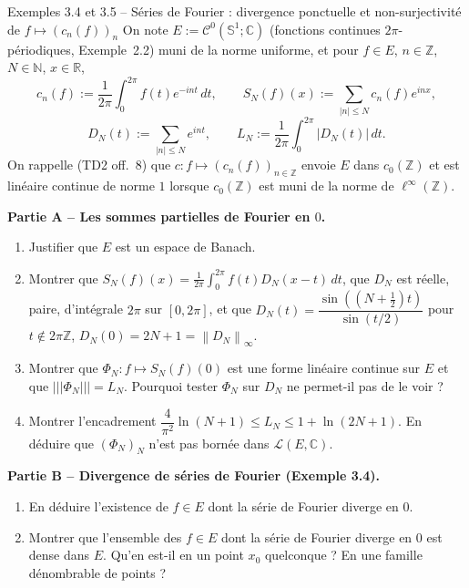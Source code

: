 \documentclass[11pt,a4paper]{article}
\newcommand{\R}{\mathbb{R}}
\newcommand{\N}{\mathbb{N}}
\newcommand{\Z}{\mathbb{Z}}
\newcommand{\C}{\mathbb{C}}
\newcommand{\norm}[1]{\left\|#1\right\|}
\newcommand{\opnorm}[1]{|\!|\!|#1|\!|\!|}
\newcommand{\Lc}{\mathcal{L}}
\newcommand{\Cz}{\mathcal{C}^0}
\newcommand{\Sun}{\mathbb{S}^1}
\theoremstyle{definition}
\begin{document}
\begin{exo}{Exemples 3.4 et 3.5 -- Séries de Fourier : divergence ponctuelle et non-surjectivité de $f\mapsto(c_n(f))_n$}
On note $E:=\Cz(\Sun;\C)$ (fonctions continues $2\pi$-périodiques, Exemple~2.2) muni de la norme uniforme, et pour $f\in E$, $n\in\Z$, $N\in\N$, $x\in\R$,
\[
c_n(f):=\frac1{2\pi}\int_0^{2\pi}f(t)e^{-int}\,dt,\qquad
S_N(f)(x):=\sum_{|n|\le N}c_n(f)e^{inx},
\]
\[
D_N(t):=\sum_{|n|\le N}e^{int},\qquad
L_N:=\frac1{2\pi}\int_0^{2\pi}|D_N(t)|\,dt .
\]
On rappelle (TD2 off.~8) que $c:f\mapsto(c_n(f))_{n\in\Z}$ envoie $E$ dans $c_0(\Z)$ et est linéaire continue de norme $1$ lorsque $c_0(\Z)$ est muni de la norme de $\ell^\infty(\Z)$.

\medskip
\noindent\textbf{Partie A -- Les sommes partielles de Fourier en $0$.}
\begin{enumerate}[label=(\alph*)]
  \item Justifier que $E$ est un espace de Banach.
  \item Montrer que $S_N(f)(x)=\frac1{2\pi}\int_0^{2\pi}f(t)D_N(x-t)\,dt$, que $D_N$ est réelle, paire, d'intégrale $2\pi$ sur $[0,2\pi]$, et que $D_N(t)=\dfrac{\sin((N+\frac12)t)}{\sin(t/2)}$ pour $t\notin2\pi\Z$, $D_N(0)=2N+1=\norm{D_N}_\infty$.
  \item Montrer que $\Phi_N:f\mapsto S_N(f)(0)$ est une forme linéaire continue sur $E$ et que $\opnorm{\Phi_N}=L_N$. Pourquoi tester $\Phi_N$ sur $D_N$ ne permet-il pas de le voir ?
  \item Montrer l'encadrement $\dfrac4{\pi^2}\ln(N+1)\le L_N\le1+\ln(2N+1)$. En déduire que $(\Phi_N)_N$ n'est pas bornée dans $\Lc(E,\C)$.
\end{enumerate}

\noindent\textbf{Partie B -- Divergence de séries de Fourier (Exemple 3.4).}
\begin{enumerate}[label=(\alph*),resume]
  \item En déduire l'existence de $f\in E$ dont la série de Fourier diverge en $0$.
  \item Montrer que l'ensemble des $f\in E$ dont la série de Fourier diverge en $0$ est dense dans $E$. Qu'en est-il en un point $x_0$ quelconque ? En une famille dénombrable de points ?
\end{enumerate}


\end{exo}
\end{document}
